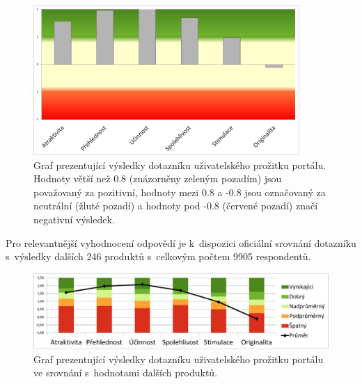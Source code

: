 \begin{figure}[H]
	\centering
	\includegraphics[width=0.9\textwidth]{obrazky-figures/ueq-result.pdf}
	\caption{Graf prezentující výsledky dotazníku uživatelského prožitku portálu. Hodnoty větší než 0.8 (znázorněny zeleným pozadím) jsou považovaný za pozitivní, hodnoty mezi 0.8 a -0.8 jsou označovaný za neutrální (žluté pozadí) a hodnoty pod -0.8 (červené pozadí) značí negativní výsledek.}
    \label{img:ueq-result}
\end{figure}

Pro relevantnější vyhodnocení odpovědí je k~dispozici oficiální srovnání dotazníku s~výsledky dalších 246 produktů s~celkovým počtem 9905 respondentů. 

\begin{figure}[H]
	\centering
	\includegraphics[width=\textwidth]{obrazky-figures/ueq-benchmark.pdf}
	\caption{Graf prezentující výsledky dotazníku uživatelského prožitku portálu ve srovnání s~hodnotami dalších produktů.}
    \label{img:ueq}
\end{figure}

